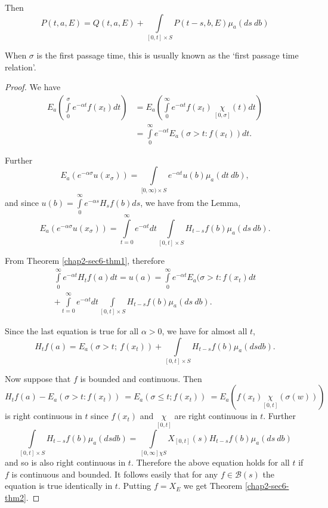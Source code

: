 Then  
$$
P (t, a, E) = Q (t, a, E) + \int \limits_{[ 0, t ] \times S} P (t-s,
b, E) \mu_a (ds~ db) 
$$

\begin{remark*}
  When $\sigma$ is the first passage time, this is usually known as
  the `first passage time relation'. 
\end{remark*}

\begin{proof}
  We have
  \begin{align*}
    E_a \left(\int \limits^{\sigma}_{0}  e^{- \alpha t } f (x_t) dt\right) &=
    E_a \left(\int \limits^{\infty}_{0} e^{- \alpha t} f(x_t) ~
    \underset{[ 0,\sigma]}{\chi} (t) dt\right) \\ 
    &= \int \limits^{\infty}_{0} e^{-\alpha t} E_a ( \sigma > t : f
    (x_t) ) dt . 
  \end{align*}

Further\pageoriginale
$$
E_a ( e^{-\alpha \sigma} u (x_\sigma)) = \int \limits_{[ 0,\infty ) \times
    S} e^{- \alpha t} u (b) \mu_a (dt~ db), 
$$
and since $u(b) = \int \limits^{\infty}_{0} e^{- \alpha s} H_s f (b)
ds$, we have from the Lemma, 
$$
E_a ( e^{-\alpha \sigma} u (x_\sigma)) = \int \limits^{\infty}_{t=0}
e^{-\alpha t} dt \int \limits_{[ 0, t] \times S} H_{t-s} f (b) \mu_a
(ds ~ db). 
$$

From Theorem \ref{chap2-sec6-thm1}, therefore
\begin{multline*}
  \int \limits^{\infty}_{0} e^{-\alpha t} H_t f (a) dt = u (a) = \int
  \limits^{\infty}_{0} e^{-\alpha t} E_a ( \sigma > t : f (x_t) dt\\ 
  +\int \limits^{\infty}_{t=0} e^{-\alpha t} dt \int \limits_{[0,t]
    \times S} H_{t-s} f (b) \mu_a (ds~ db). 
\end{multline*}

Since the last equation is true for all $\alpha > 0$, we have for
almost all $t$, 
$$
H_t f(a) = E_a ( \sigma > t; ~ f(x_t)) + \int \limits_{[ 0,t ] \times
  S} H_{t-s} f (b) \mu_a (dsdb). 
$$

Now suppose that $f$ is bounded and continuous. Then
$$
H_t f (a) -E_{a}( \sigma > t : f (x_t)) ~ = E_a ( \sigma \leq t; f (x_t)) ~
= E_a ( f (x_t) \underset{[ 0,t]}{\chi} ( \sigma (w))) 
$$
is right continuous in $t$ since $f (x_t)$ and $\underset{[
    0,t]}{\chi}$ are right continuous in $t$. Further 
$$
\int \limits_{[ 0,t ] \times S} H_{t-s} f (b) \mu_a (dsdb) = \int
\limits_{[0, \infty]\chi S}X_{[ 0, t ] }(s) H_{t-s} f (b) \mu_a (ds
~ db) 
$$\pageoriginale
and so is also right continuous in $t$. Therefore the above equation
holds for all $t$ if $f$ is continuous and bounded. It follows easily
that for any $f \in \mathscr{B} (s)$ the equation is true identically
in $t$. Putting $f = X_E$ we get Theorem \ref{chap2-sec6-thm2}. 


\end{proof}
